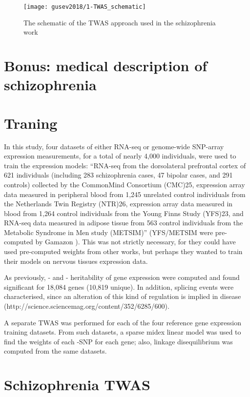 \documentclass[../main.tex]{subfiles}
\begin{document}
\begin{figure}
	\texttt{[image: gusev2018/1-TWAS\_schematic]}
	\caption{The schematic of the TWAS approach used in the 
schizophrenia work}
\end{figure}

\section{Bonus: medical description of schizophrenia}

\section{Traning}

In this study, four datasets of either RNA-seq or genome-wide SNP-array 
expression measurements, for a total of nearly 4,000 individuals,  were 
used to train the expression models: \enquote{RNA-seq from the 
dorsolateral prefrontal cortex of 621 individuals (including 283 
schizophrenia cases, 47 bipolar cases, and 291 controls) collected by 
the CommonMind Consortium (CMC)25, expression array data measured in 
peripheral blood from 1,245 unrelated control individuals from the 
Netherlands Twin Registry (NTR)26, expression array data measured in 
blood from 1,264 control individuals from the Young Finns Study (YFS)23, 
and RNA-seq data measured in adipose tissue from 563 control individuals 
from the Metabolic Syndrome in Men study (METSIM)} (YFS/METSIM were 
pre-computed by Gamazon ). This was not strictly necessary, 
for they could have used pre-computed weights from other works, but 
perhaps they wanted to train their models on nervous tissues expression 
data.

As previously, \cis- and \trans- heritability of gene expression were 
computed and found significant for 18,084 genes (10,819 unique). In 
addition, splicing events were characterised, since an alteration of 
this kind of regulation is implied in disease 
(http://science.sciencemag.org/content/352/6285/600).

A separate TWAS was performed for each of the four reference gene 
expression training datasets. From such datasets, a sparse midex linear 
model was used to find the weights of each \cis-SNP for each gene; also, 
linkage disequilibrium was computed from the same datasets.

\section{Schizophrenia TWAS}
\end{document}
